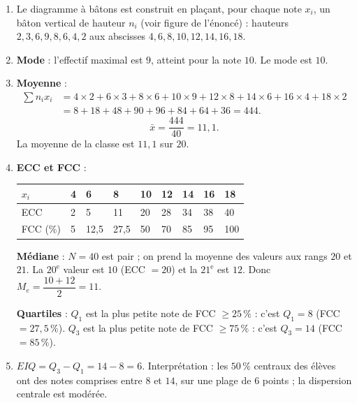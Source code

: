 \documentclass[11pt]{article}
\begin{document}
\begin{corrige}
\begin{enumerate}
    \item Le diagramme à bâtons est construit en plaçant, pour chaque note $x_i$, un bâton vertical de hauteur $n_i$ (voir figure de l'énoncé) : hauteurs $2, 3, 6, 9, 8, 6, 4, 2$ aux abscisses $4, 6, 8, 10, 12, 14, 16, 18$.
    \item \textbf{Mode} : l'effectif maximal est $9$, atteint pour la note $10$. Le mode est $\boxed{10}$.
    \item \textbf{Moyenne} :
    \begin{align*}
    \sum n_i x_i &= 4\times 2+6\times 3+8\times 6+10\times 9+12\times 8+14\times 6+16\times 4+18\times 2\\
    &= 8+18+48+90+96+84+64+36 = 444.
    \end{align*}
    \[ \bar{x}=\frac{444}{40}=11{,}1. \]
    La moyenne de la classe est $\boxed{11{,}1}$ sur $20$.
    \item \textbf{ECC et FCC} :
    \begin{center}
    \begin{tabularx}{\linewidth}{|l|X|X|X|X|X|X|X|X|}
    \hline
    \rowcolor{popblueL}
    $x_i$ & 4 & 6 & 8 & 10 & 12 & 14 & 16 & 18 \\
    \hline
    ECC & 2 & 5 & 11 & 20 & 28 & 34 & 38 & 40 \\
    \hline
    FCC (\%) & 5 & 12,5 & 27,5 & 50 & 70 & 85 & 95 & 100 \\
    \hline
    \end{tabularx}
    \end{center}
    \textbf{Médiane} : $N=40$ est pair ; on prend la moyenne des valeurs aux rangs $20$ et $21$. La $20^{\text{e}}$ valeur est $10$ (ECC $=20$) et la $21^{\text{e}}$ est $12$. Donc $M_e=\dfrac{10+12}{2}=\boxed{11}$.
    
    \textbf{Quartiles} : $Q_1$ est la plus petite note de FCC $\ge 25\,\%$ : c'est $\boxed{Q_1=8}$ (FCC $=27{,}5\,\%$). $Q_3$ est la plus petite note de FCC $\ge 75\,\%$ : c'est $\boxed{Q_3=14}$ (FCC $=85\,\%$).
    \item $EIQ = Q_3-Q_1 = 14-8 = \boxed{6}$. Interprétation : les $50\,\%$ centraux des élèves ont des notes comprises entre $8$ et $14$, sur une plage de $6$ points ; la dispersion centrale est modérée.
\end{enumerate}
\end{corrige}
\end{document}
